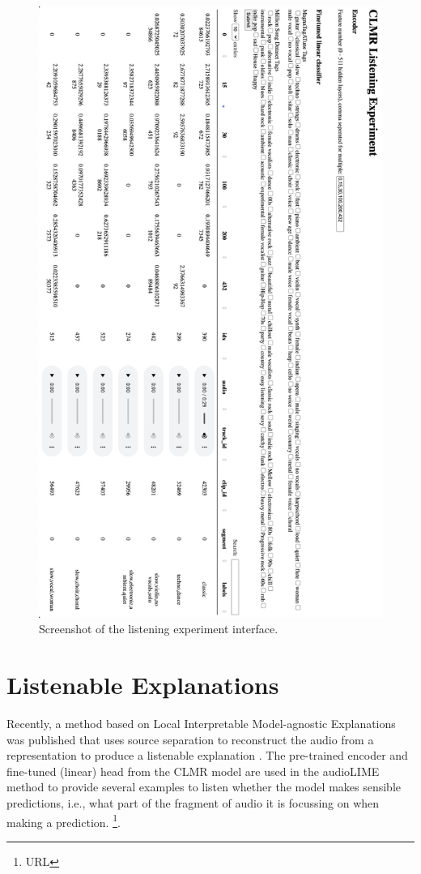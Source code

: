 \begin{figure}[h]
    \centering
    \includegraphics[width=\textwidth]{figs/listening_experiment.png}
    \caption{Screenshot of the listening experiment interface.}
    \label{fig:listening_experiment}
\end{figure}

\section{Listenable Explanations}
Recently, a method based on Local Interpretable Model-agnostic Explanations was published that uses source separation to reconstruct the audio from a representation to produce a listenable explanation \cite{haunschmid2020audiolime}. The pre-trained encoder and fine-tuned (linear) head from the CLMR model are used in the audioLIME method to provide several examples to listen whether the model makes sensible predictions, i.e., what part of the fragment of audio it is focussing on when making a prediction. \footnote{URL}.
